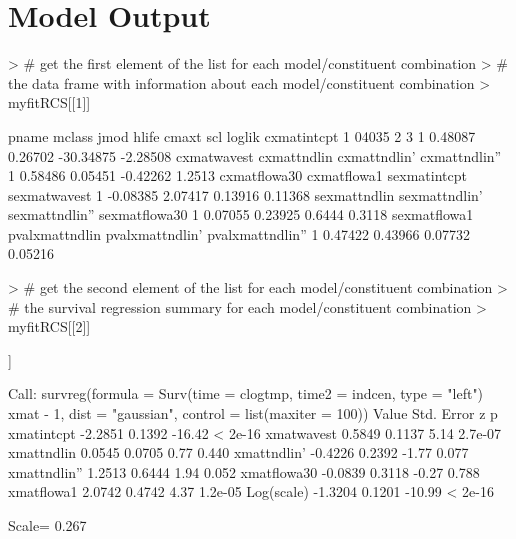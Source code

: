 \documentclass[11pt]{article}
\begin{document}
\section{Model Output}

\begin{Schunk}
\begin{Sinput}
> # get the first element of the list for each model/constituent combination
> # the data frame with information about each model/constituent combination
> myfitRCS[[1]]
\end{Sinput}
\begin{Soutput}
  pname mclass jmod hlife   cmaxt     scl    loglik cxmatintcpt
1 04035      2    3     1 0.48087 0.26702 -30.34875    -2.28508
  cxmatwavest cxmattndlin cxmattndlin' cxmattndlin''
1     0.58486     0.05451     -0.42262        1.2513
  cxmatflowa30 cxmatflowa1 sexmatintcpt sexmatwavest
1     -0.08385     2.07417      0.13916      0.11368
  sexmattndlin sexmattndlin' sexmattndlin'' sexmatflowa30
1      0.07055       0.23925         0.6444        0.3118
  sexmatflowa1 pvalxmattndlin pvalxmattndlin' pvalxmattndlin''
1      0.47422        0.43966         0.07732          0.05216
\end{Soutput}
\begin{Sinput}
> # get the second element of the list for each model/constituent combination
> # the survival regression summary for each model/constituent combination
> myfitRCS[[2]]
\end{Sinput}
\begin{Soutput}
[[1]]

Call:
survreg(formula = Surv(time = clogtmp, time2 = indcen, type = "left") ~ 
    xmat - 1, dist = "gaussian", control = list(maxiter = 100))
               Value Std. Error      z       p
xmatintcpt   -2.2851     0.1392 -16.42 < 2e-16
xmatwavest    0.5849     0.1137   5.14 2.7e-07
xmattndlin    0.0545     0.0705   0.77   0.440
xmattndlin'  -0.4226     0.2392  -1.77   0.077
xmattndlin''  1.2513     0.6444   1.94   0.052
xmatflowa30  -0.0839     0.3118  -0.27   0.788
xmatflowa1    2.0742     0.4742   4.37 1.2e-05
Log(scale)   -1.3204     0.1201 -10.99 < 2e-16

Scale= 0.267 


\end{Soutput}
\end{Schunk}
\end{document}
